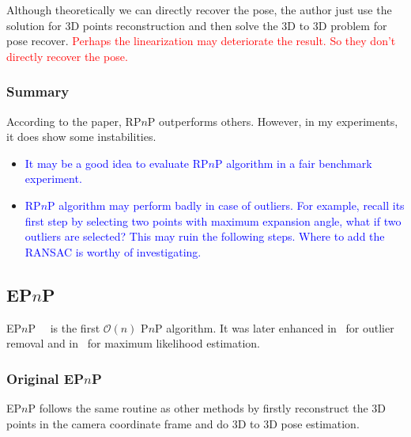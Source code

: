 \documentclass[a4paper]{report}
\begin{document}
Although theoretically we can directly recover the pose, the author just use the solution for $3$D points reconstruction and then solve the $3$D to $3$D problem for pose recover. \textcolor{red}{Perhaps the linearization may deteriorate the result. So they don't directly recover the pose.}

\subsubsection{Summary}
According to the paper, RP$n$P outperforms others. However, in my experiments, it does show some instabilities. 
\begin{itemize}
\item \textcolor{blue}{It may be a good idea to evaluate RP$n$P algorithm in a fair benchmark experiment.}
\item \textcolor{blue}{RP$n$P algorithm may perform badly in case of outliers. For example, recall its first step by selecting two points with maximum expansion angle, what if two outliers are selected? This may ruin the following steps. Where to add the RANSAC is worthy of investigating.}
\end{itemize}

\subsection{EP$n$P}
EP$n$P~\cite{lepetit2009epnp}~\cite{moreno2007accurate} is the first $\mathcal{O}(n)$ P$n$P algorithm. It was later enhanced in~\cite{ferraz2014very} for outlier removal and in~\cite{ferraz2014leveraging} for maximum likelihood estimation.
\subsubsection{Original EP$n$P}
EP$n$P follows the same routine as other methods by firstly reconstruct the $3$D points in the camera coordinate frame and do $3$D to $3$D pose estimation.
\end{document}
